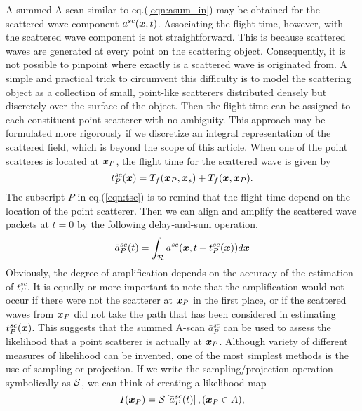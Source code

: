 ﻿\documentclass[11pt,a4j]{article}
\begin{document}
A summed A-scan similar to eq.(\ref{eqn:asum_in}) may be obtained for the 
scattered wave component $a^{sc}(\mbox{\boldmath $x$},t)$. 
Associating the flight time, however, with the scattered wave component is not straightforward. 
This is because scattered waves are generated at every point on the scattering object. 
Consequently, it is not possible to pinpoint where exactly is a scattered wave is originated from. 
 A simple and practical trick to circumvent this difficulty is to model the scattering object 
 as a collection of small, point-like scatterers distributed densely but discretely over 
 the surface of the object. Then the flight time can be assigned to each constituent point scatterer 
 with no ambiguity. This approach may be formulated more rigorously if we discretize an 
 integral representation of the scattered field, which is beyond the scope of this article.
When one of the point scatteres is located at $\mbox{\boldmath $x$}_P$, the flight time for the scattered wave 
 is given by 
\begin{equation}
	t_P^{sc}(\mbox{\boldmath $x$})=
	T_f(\mbox{\boldmath $x$}_P,\mbox{\boldmath $x$}_s)
	+
	T_f(\mbox{\boldmath $x$},\mbox{\boldmath $x$}_P).
	\label{eqn:tsc}
\end{equation}
The subscript $P$ in eq.(\ref{eqn:tsc}) is to remind that the flight time depend 
on the location of the point scatterer.
Then we can align and amplify the scattered wave packets at $t=0$ by the following delay-and-sum operation. 
\begin{equation}
	\bar{a}^{sc}_P(t)=\int _{\cal R} a^{sc}(\mbox{\boldmath $x$},t+t^{sc}_P(\mbox{\boldmath $x$}))d\mbox{\boldmath $x$}
	\label{eqn:asum_sc}
\end{equation}
Obviously, the degree of amplification depends on the accuracy of the estimation of $t^{sc}_P$. 
It is equally or more important to note that the amplification would not occur if there were not 
the scatterer at $\mbox{\boldmath $x$}_P$ in the first place, or if the scattered waves from $\mbox{\boldmath $x$}_P$ did 
not take the path that has been considered in estimating $t^{sc}_P(\mbox{\boldmath $x$})$.
This suggests that the summed A-scan $\bar a^{sc}_P$ can be used to assess the likelihood that 
a point scatterer is actually at $\mbox{\boldmath $x$}_P$. 
Although variety of different measures of likelihood can be invented, one of the 
most simplest methods is the use of sampling or projection. 
If we write the sampling/projection operation symbolically as ${\cal S}$, 
we can think of creating a likelihood map 
\begin{equation}
	I(\mbox{\boldmath $x$}_P)={\cal S} \left[ \bar{a}^{sc}_P(t) \right], 
	(\mbox{\boldmath $x$}_P \in A),
	\label{eqn:image}
\end{equation}
\end{document}

